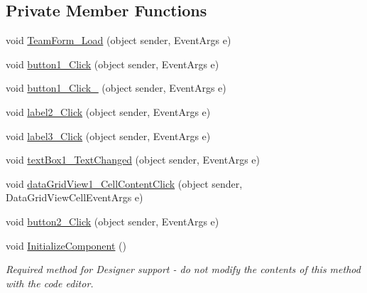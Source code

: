 \subsection*{Private Member Functions}
\begin{DoxyCompactItemize}
\item 
void \hyperlink{classProject__Codename__Olympia__v1_1_1__0_1_1TeamForm_a056d75a41ff0dd5609619fbc495b6507}{Team\+Form\+\_\+\+Load} (object sender, Event\+Args e)
\item 
void \hyperlink{classProject__Codename__Olympia__v1_1_1__0_1_1TeamForm_aa33ed7de0d1c36522fb549a2057f253d}{button1\+\_\+\+Click} (object sender, Event\+Args e)
\item 
void \hyperlink{classProject__Codename__Olympia__v1_1_1__0_1_1TeamForm_a76e1c1085ac0126da1d00c3fd1d60887}{button1\+\_\+\+Click\+\_} (object sender, Event\+Args e)
\item 
void \hyperlink{classProject__Codename__Olympia__v1_1_1__0_1_1TeamForm_a6d4d6a7293fb11c1446bae7630b2aa31}{label2\+\_\+\+Click} (object sender, Event\+Args e)
\item 
void \hyperlink{classProject__Codename__Olympia__v1_1_1__0_1_1TeamForm_a90de43b62ba8a02f2e8d6f8dcaabbddf}{label3\+\_\+\+Click} (object sender, Event\+Args e)
\item 
void \hyperlink{classProject__Codename__Olympia__v1_1_1__0_1_1TeamForm_a8138adb4b7a129b09ebfa72537213736}{text\+Box1\+\_\+\+Text\+Changed} (object sender, Event\+Args e)
\item 
void \hyperlink{classProject__Codename__Olympia__v1_1_1__0_1_1TeamForm_a98f2248cea12c0ac338397db23326c3e}{data\+Grid\+View1\+\_\+\+Cell\+Content\+Click} (object sender, Data\+Grid\+View\+Cell\+Event\+Args e)
\item 
void \hyperlink{classProject__Codename__Olympia__v1_1_1__0_1_1TeamForm_af9996206ccdeba7a8c9b6c6fa6b916c7}{button2\+\_\+\+Click} (object sender, Event\+Args e)
\item 
void \hyperlink{classProject__Codename__Olympia__v1_1_1__0_1_1TeamForm_a3dfe23e78378f5d6ca267a57345840a2}{Initialize\+Component} ()
\begin{DoxyCompactList}\small\item\em Required method for Designer support -\/ do not modify the contents of this method with the code editor. \end{DoxyCompactList}\end{DoxyCompactItemize}
